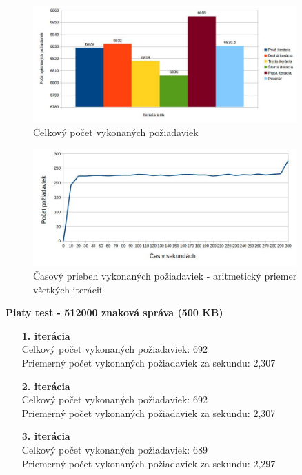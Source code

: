 \documentclass[12pt,oneside,final]{fithesis-utf8}
\begin{document}
\begin{itemize}
\begin{itemize}
\end{itemize}

\begin{figure}[H]
  \centering
      \includegraphics[width=0.9\textwidth]{gatling3_4.jpg}
  \caption{Celkový počet vykonaných požiadaviek}
\end{figure}

\begin{figure}[H]
  \centering
      \includegraphics[width=0.9\textwidth]{gatling3_4_distr.jpg}
  \caption{Časový priebeh vykonaných požiadaviek - aritmetický priemer všetkých iterácií}
\end{figure}

\textbf{Piaty test - 512000 znaková správa (500 KB)}
\begin{itemize}

\item[\textbf{1. iterácia}]\ \\
Celkový počet vykonaných požiadaviek: 692\\
Priemerný počet vykonaných požiadaviek za sekundu: 2,307

\item[\textbf{2. iterácia}]\ \\
Celkový počet vykonaných požiadaviek: 692\\
Priemerný počet vykonaných požiadaviek za sekundu: 2,307

\item[\textbf{3. iterácia}]\ \\
Celkový počet vykonaných požiadaviek: 689\\
Priemerný počet vykonaných požiadaviek za sekundu: 2,297


\end{itemize}
\end{itemize}
\end{document}
